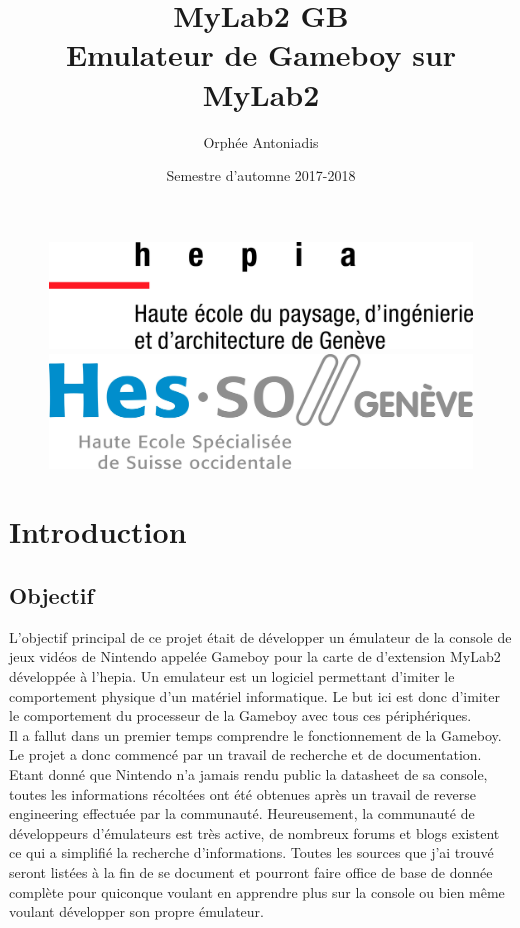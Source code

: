 \documentclass[a4paper]{article}
\title{MyLab2 GB \protect\\ Emulateur de Gameboy sur MyLab2}
\author{Orphée Antoniadis}
\affil{\small Projet de semestre - Prof. Fabien Vannel}
\affil{\small Hepia ITI 3\up{ème} année}
\date{Semestre d'automne 2017-2018}
\begin{document}
\maketitle

\begin{figure}[!b]
	\centering
	\begin{minipage}{.5\textwidth}
		\centering
		\includegraphics[width=.6\linewidth]{images/hepia.jpg}
	\end{minipage}%
	\begin{minipage}{.5\textwidth}
		\centering
		\includegraphics[width=.6\linewidth]{images/hesso.jpg}
	\end{minipage}
\end{figure}
\newpage

\newpage
\setcounter{tocdepth}{3}
\tableofcontents
\newpage


\section{Introduction}
\subsection{Objectif}
L'objectif principal de ce projet était de développer un émulateur de la console
de jeux vidéos de Nintendo appelée Gameboy pour la carte de d'extension MyLab2
développée à l'hepia. Un emulateur est un logiciel permettant d'imiter le comportement
physique d'un matériel informatique. Le but ici est donc d'imiter le comportement
du processeur de la Gameboy avec tous ces périphériques. \\

Il a fallut dans un premier temps comprendre le fonctionnement de la Gameboy. 
Le projet a donc commencé par un travail de recherche et de documentation. Etant 
donné que Nintendo n'a jamais rendu public la datasheet de sa console, toutes les 
informations récoltées ont été obtenues après un travail de reverse engineering 
effectuée par la communauté. Heureusement, la communauté de développeurs d'émulateurs 
est très active, de nombreux forums et blogs existent ce qui a simplifié la recherche
d'informations. Toutes les sources que j'ai trouvé seront listées à la fin de se 
document et pourront faire office de base de donnée complète pour quiconque voulant 
en apprendre plus sur la console ou bien même voulant développer son propre émulateur.
\end{document}
